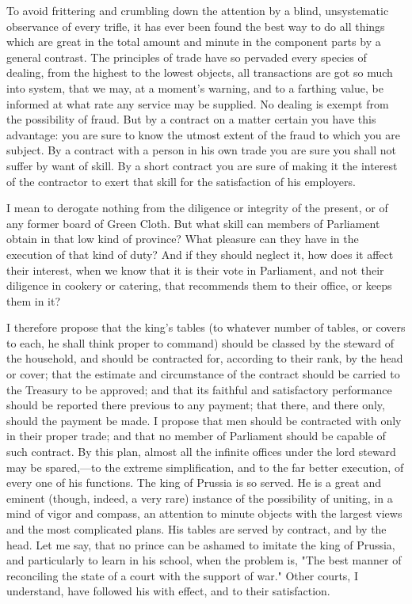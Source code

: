 To avoid frittering and crumbling down the attention by a blind, unsystematic observance of every trifle, it has ever been found the best way to do all things which are great in the total amount and minute in the component parts by a general contrast. The principles of trade have so pervaded every species of dealing, from the highest to the lowest objects, all transactions are got so much into system, that we may, at a moment's warning, and to a farthing value, be informed at what rate any service may be supplied. No dealing is exempt from the possibility of fraud. But by a contract on a matter certain you have this advantage: you are sure to know the utmost extent of the fraud to which you are subject. By a contract with a person in his own trade you are sure you shall not suffer by want of skill. By a short contract you are sure of making it the interest of the contractor to exert that skill for the satisfaction of his employers.

I mean to derogate nothing from the diligence or integrity of the present, or of any former board of Green Cloth. But what skill can members of Parliament obtain in that low kind of province? What pleasure can they have in the execution of that kind of duty? And if they should neglect it, how does it affect their interest, when we know that it is their vote in Parliament, and not their diligence in cookery or catering, that recommends them to their office, or keeps them in it?

I therefore propose that the king's tables (to whatever number of tables, or covers to each, he shall think proper to command) should be classed by the steward of the household, and should be contracted for, according to their rank, by the head or cover; that the estimate and circumstance of the contract should be carried to the Treasury to be approved; and that its faithful and satisfactory performance should be reported there previous to any payment; that there, and there only, should the payment be made. I propose that men should be contracted with only in their proper trade; and that no member of Parliament should be capable of such contract. By this plan, almost all the infinite offices under the lord steward may be spared,—to the extreme simplification, and to the far better execution, of every one of his functions. The king of Prussia is so served. He is a great and eminent (though, indeed, a very rare) instance of the possibility of uniting, in a mind of vigor and compass, an attention to minute objects with the largest views and the most complicated plans. His tables are served by contract, and by the head. Let me say, that no prince can be ashamed to imitate the king of Prussia, and particularly to learn in his school, when the problem is, "The best manner of reconciling the state of a court with the support of war." Other courts, I understand, have followed his with effect, and to their satisfaction.

